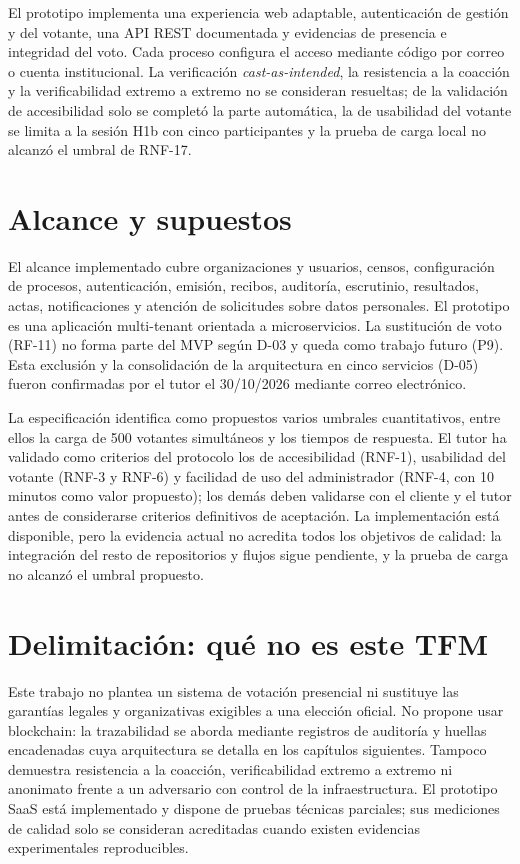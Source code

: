 El prototipo implementa una experiencia web adaptable, autenticación de
gestión y del votante, una API REST documentada y evidencias de presencia e
integridad del voto. Cada proceso configura el acceso mediante código por
correo o cuenta institucional. La verificación \emph{cast-as-intended}, la
resistencia a la coacción y la verificabilidad extremo a extremo no se
consideran resueltas; de la validación de accesibilidad solo se completó la
parte automática, la de usabilidad del votante se limita a la sesión H1b con cinco
participantes y la prueba de carga local no alcanzó el umbral de RNF-17.

\section{Alcance y supuestos}
\label{sec:alcance}

El alcance implementado cubre organizaciones y usuarios, censos, configuración
de procesos, autenticación, emisión, recibos, auditoría, escrutinio,
resultados, actas, notificaciones y atención de solicitudes sobre datos
personales. El prototipo es una aplicación multi-tenant orientada a
microservicios. La sustitución de voto (RF-11) no forma parte del MVP según
D-03 y queda como trabajo futuro (P9). Esta exclusión y la consolidación de la
arquitectura en cinco servicios (D-05) fueron confirmadas por el tutor el
30/10/2026 mediante correo electrónico.

La especificación identifica como propuestos varios umbrales cuantitativos,
entre ellos la carga de 500 votantes simultáneos y los tiempos de respuesta.
El tutor ha validado como criterios del protocolo los de accesibilidad
(RNF-1), usabilidad del votante (RNF-3 y RNF-6) y facilidad de uso del
administrador (RNF-4, con 10 minutos como valor propuesto); los demás deben
validarse con el cliente y el tutor antes de considerarse criterios
definitivos de aceptación. La implementación está disponible, pero
la evidencia actual no acredita todos los objetivos de calidad: la
integración del resto de repositorios y flujos sigue pendiente, y la prueba de carga no alcanzó el umbral propuesto.

\section{Delimitación: qué no es este TFM}
\label{sec:delimitacion}

Este trabajo no plantea un sistema de votación presencial ni sustituye las
garantías legales y organizativas exigibles a una elección oficial. No propone
usar blockchain: la trazabilidad se aborda mediante registros de auditoría y
huellas encadenadas cuya arquitectura se detalla en los capítulos siguientes. Tampoco demuestra
resistencia a la coacción, verificabilidad extremo a extremo ni anonimato
frente a un adversario con control de la infraestructura. El prototipo SaaS
está implementado y dispone de pruebas técnicas parciales; sus mediciones de
calidad solo se consideran acreditadas cuando existen evidencias experimentales
reproducibles.

